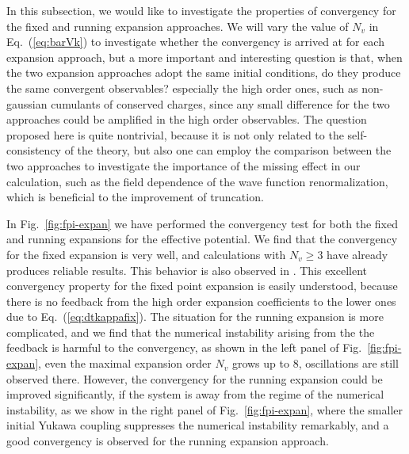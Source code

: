 \documentclass[%
reprint,
superscriptaddress,
showpacs,preprintnumbers,
 amsmath,amssymb,
 aps,
prd,
]{revtex4-1}
\def\Fig#1{Fig.~\ref{#1}} \def\Tab#1{Tab.~\ref{#1}}
\def\Eq#1{Eq.~(\ref{#1})}
\begin{document}

In this subsection, we would like to investigate the properties of convergency for the fixed and running expansion approaches. We will vary the value of $N_v$ in \Eq{eq:barVk} to investigate whether the convergency is arrived at for each expansion approach, but a more important and interesting question is that, when the two expansion approaches adopt the same initial conditions, do they produce the same convergent observables? especially the high order ones, such as non-gaussian cumulants of conserved charges, since any small difference for the two approaches could be amplified in the high order observables. The question proposed here is quite nontrivial, because it is not only related to the self-consistency of the theory, but also one can employ the comparison between the two approaches to investigate the importance of the missing effect in our calculation, such as the field dependence of the wave function renormalization, which is beneficial to the improvement of truncation. 

In \Fig{fig:fpi-expan} we have performed the convergency test for both the fixed and running expansions for the effective potential. We find that the convergency for the fixed expansion is very well, and calculations with $N_v\geq 3$ have already produces reliable results. This behavior is also observed in \cite{Pawlowski:2014zaa}. This excellent convergency property for the fixed point expansion is easily understood, because there is no feedback from the high order expansion coefficients to the lower ones due to \Eq{eq:dtkappafix}. The situation for the running expansion is more complicated, and we find that the numerical instability arising from the the feedback is harmful to the convergency, as shown in the left panel of \Fig{fig:fpi-expan}, even the maximal expansion order $N_v$ grows up to 8, oscillations are still observed there. However, the convergency for the running expansion could be improved significantly, if the system is away from the regime of the numerical instability, as we show in the right panel of \Fig{fig:fpi-expan}, where the smaller initial Yukawa coupling suppresses the numerical instability remarkably, and a good convergency is observed for the running expansion approach. 
\end{document}
